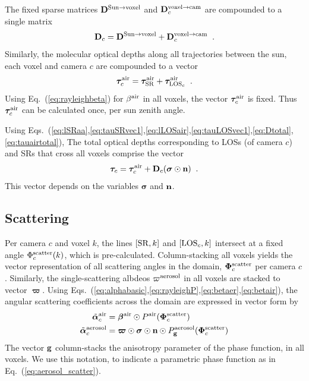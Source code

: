 \documentclass[10pt,twocolumn,letterpaper]{article}
\newcommand{\vect}[1]{\bm{#1}}
\begin{document}
The fixed sparse matrices ${\bf D}^{\mathrm{Sun \rightarrow voxel}}$ and
${\bf D}^{\mathrm{voxel \rightarrow cam}}_c$ are compounded to a single matrix
\begin{equation}
  {\bf D}_c=
  {\bf D}^{\mathrm{Sun \rightarrow voxel}}+
  {\bf D}^{\mathrm{voxel \rightarrow cam}}_c
  \;\;.
  \label{eq:Dtotal}
\end{equation}
Similarly, the molecular optical depths along all trajectories between the sun, each voxel
and camera $c$ are compounded to a vector
\begin{equation}
  \vect{\tau}_c^{\rm air}=
  \vect{\tau}_{\rm SR}^{\rm air}+
  \vect{\tau}_{{\rm LOS}_c}^{\rm air}
  \;\;.
  \label{eq:tauairtotal}
\end{equation}
Using Eq.~(\ref{eq:rayleighbeta}) for $\beta^{\rm air}$ in all voxels,
the vector $\vect{\tau}_c^{\rm air}$ is fixed. Thus $\vect{\tau}_c^{\rm air}$ can
be calculated once, per sun zenith angle.

Using Eqs.~(\ref{eq:lSRaa},\ref{eq:tauSRvec1},\ref{eq:lLOSair},\ref{eq:tauLOSvec1},\ref{eq:Dtotal},\ref{eq:tauairtotal}),
The total optical depths corresponding to LOSs (of camera $c$)  and SRs that cross all voxels comprise the vector
\begin{equation}
  \vect{\tau}_c= \vect{\tau}_c^{\rm air}
               + {\bf D}_c (\vect{\sigma} \odot {\bf n})
  \;\;.
  \label{eq:tautotal}
\end{equation}
This vector depends on the variables $\vect{\sigma}$ and ${\bf n}$.

\subsection{Scattering}
\label{sec:scattering}

Per camera $c$ and voxel $k$, the lines $[{\rm SR},k]$ and $[{\rm LOS}_c,k]$ intersect at a
fixed angle $\Phi^{\rm scatter}_c(k)$, which is pre-calculated.
Column-stacking all voxels yields the vector representation of all scattering angles in the domain, $\vect{\Phi}^{\rm scatter}_c$ per camera $c$. Similarly, the single-scattering albdeos
$\varpi^{\rm aerosol}$ in all voxels are stacked to vector $\vect{\varpi}$.
Using Eqs.~(\ref{eq:alphabasic},\ref{eq:rayleighP},\ref{eq:betaer},\ref{eq:betair}), the angular scattering coefficients across the domain are expressed in vector form by
\begin{align}
  \tilde{\vect{\alpha}}^{\rm air}_c &=
    \vect{\beta}^{\rm air} \odot P^{\rm air}(\vect{\Phi}^{\rm scatter}_c)   \nonumber \\
  \tilde{\vect{\alpha}}^{\rm aerosol}_c &=
     \vect{\varpi}\odot
     \vect{\sigma} \odot
     {\bf n} \odot
     P^{\rm aerosol}_{\bf g}(\vect{\Phi}^{\rm scatter}_c)
  \label{eq:alpha_matrix}
\end{align}
The vector ${\bf g}$ column-stacks the anisotropy parameter of the phase function, in all voxels. We use this notation, to indicate a parametric phase function as in Eq.~(\ref{eq:aerosol_scatter}).
\end{document}
